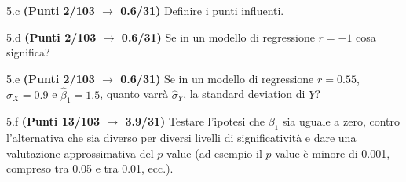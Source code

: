 \documentclass[
  11pt,
]{book}
\theoremstyle{mytheoremstyle}
\theoremstyle{mydefstyle}
\begin{document}
5.c \textbf{(Punti 2/103 \(\rightarrow\) 0.6/31)} Definire i punti influenti.

5.d \textbf{(Punti 2/103 \(\rightarrow\) 0.6/31)} Se in un modello di regressione \(r=-1\) cosa significa?

5.e \textbf{(Punti 2/103 \(\rightarrow\) 0.6/31)} Se in un modello di regressione \(r=0.55\), \(\hat\sigma_X=0.9\) e \(\hat\beta_1=1.5\), quanto varrà
\(\hat\sigma_Y\), la standard deviation di \(Y\)?

5.f \textbf{(Punti 13/103 \(\rightarrow\) 3.9/31)} Testare l'ipotesi che \(\beta_1\) sia uguale a zero, contro l'alternativa che sia diverso per diversi livelli di significatività e dare una valutazione approssimativa del \(p\)-value (ad esempio il \(p\)-value è minore di 0.001, compreso tra 0.05 e tra 0.01, ecc.).
\end{document}
